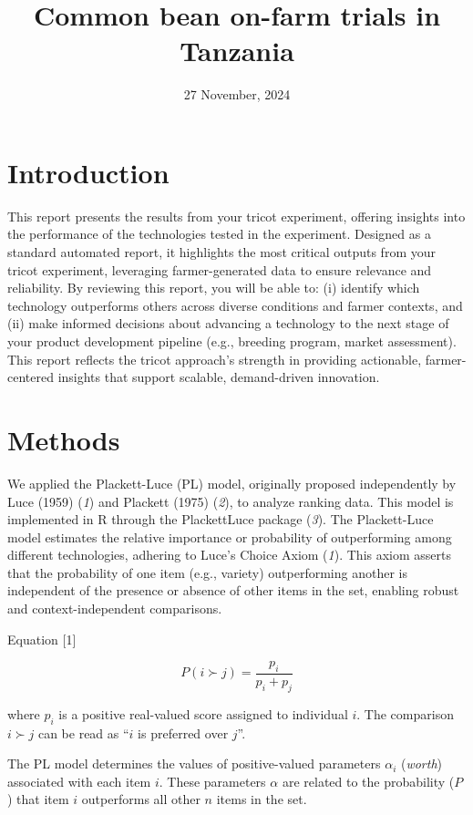\documentclass[
]{article}
\title{Common bean on-farm trials in Tanzania}
\author{}
\date{\vspace{-2.5em}27 November, 2024}
\begin{document}
\maketitle

{
\setcounter{tocdepth}{2}
\tableofcontents
}
\section{Introduction}\label{introduction}

This report presents the results from your tricot experiment, offering
insights into the performance of the technologies tested in the
experiment. Designed as a standard automated report, it highlights the
most critical outputs from your tricot experiment, leveraging
farmer-generated data to ensure relevance and reliability. By reviewing
this report, you will be able to: (i) identify which technology
outperforms others across diverse conditions and farmer contexts, and
(ii) make informed decisions about advancing a technology to the next
stage of your product development pipeline (e.g., breeding program,
market assessment). This report reflects the tricot approach's strength
in providing actionable, farmer-centered insights that support scalable,
demand-driven innovation.

\section{Methods}\label{methods}

We applied the Plackett-Luce (PL) model, originally proposed
independently by Luce (1959) (\emph{1}) and Plackett (1975) (\emph{2}),
to analyze ranking data. This model is implemented in R through the
PlackettLuce package (\emph{3}). The Plackett-Luce model estimates the
relative importance or probability of outperforming among different
technologies, adhering to Luce's Choice Axiom (\emph{1}). This axiom
asserts that the probability of one item (e.g., variety) outperforming
another is independent of the presence or absence of other items in the
set, enabling robust and context-independent comparisons.

Equation {[}1{]}

\[P (i \succ j) = \frac{p_i}{p_i + p_j}\]

where \(p_i\) is a positive real-valued score assigned to individual
\(i\). The comparison \(i \succ j\) can be read as ``\(i\) is preferred
over \(j\)''.

The PL model determines the values of positive-valued parameters
\(\alpha_i\) (\emph{worth}) associated with each item \(i\). These
parameters \(\alpha\) are related to the probability (\(P\)) that item
\(i\) outperforms all other \(n\) items in the set.
\end{document}
